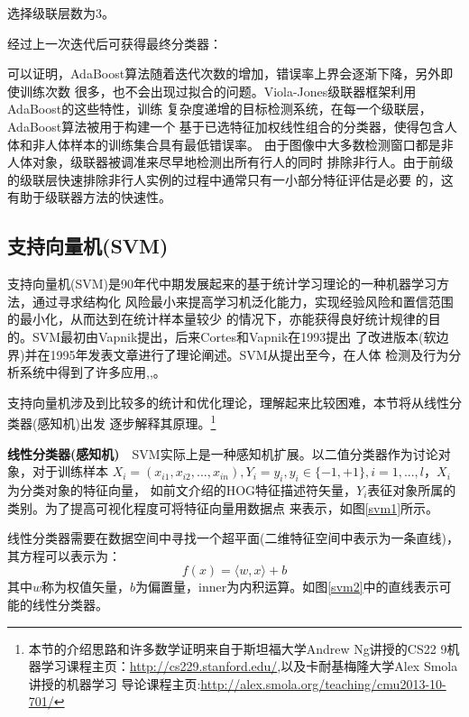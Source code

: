 选择级联层数为3。

经过上一次迭代后可获得最终分类器：

可以证明，AdaBoost算法随着迭代次数的增加，错误率上界会逐渐下降，另外即使训练次数
很多，也不会出现过拟合的问题。Viola-Jones级联器框架利用AdaBoost的这些特性，训练
复杂度递增的目标检测系统\cite{haar}，在每一个级联层，AdaBoost算法被用于构建一个
基于已选特征加权线性组合的分类器，使得包含人体和非人体样本的训练集合具有最低错误率。
由于图像中大多数检测窗口都是非人体对象，级联器被调准来尽早地检测出所有行人的同时
排除非行人。由于前级的级联层快速排除非行人实例的过程中通常只有一小部分特征评估是必要
的，这有助于级联器方法的快速性。

\subsection{支持向量机(SVM)}
支持向量机(SVM)是90年代中期发展起来的基于统计学习理论的一种机器学习方法，通过寻求结构化
风险最小来提高学习机泛化能力，实现经验风险和置信范围的最小化，从而达到在统计样本量较少
的情况下，亦能获得良好统计规律的目的。SVM最初由Vapnik提出，后来Cortes和Vapnik在1993提出
了改进版本(软边界)并在1995年发表文章\cite{svmorigin}进行了理论阐述。SVM从提出至今，在人体
检测及行为分析系统中得到了许多应用\cite{kth},\cite{DT2005},\cite{stip}。

支持向量机涉及到比较多的统计和优化理论，理解起来比较困难，本节将从线性分类器(感知机)出发
逐步解释其原理。\footnote{本节的介绍思路和许多数学证明来自于斯坦福大学Andrew Ng讲授的CS22
9机器学习课程主页：\url{http://cs229.stanford.edu/},以及卡耐基梅隆大学Alex Smola讲授的机器学习
导论课程主页:\url{http://alex.smola.org/teaching/cmu2013-10-701/}}

\textbf{线性分类器(感知机)}~~SVM实际上是一种感知机扩展。以二值分类器作为讨论对象，对于训练样本
$X_i=(x_{i1},x_{i2},...,x_{in}),Y_i=y_i,y_i\in\{-1,+1\},i=1,...,l$，$X_i$为分类对象的特征向量，
如前文介绍的HOG特征描述符矢量，$Y_i$表征对象所属的类别。为了提高可视化程度可将特征向量用数据点
来表示，如图\ref{svm1}所示。


线性分类器需要在数据空间中寻找一个超平面(二维特征空间中表示为一条直线)，其方程可以表示为：
\begin{equation}
    f(x)=\langle{}w,x\rangle+b
\end{equation}
其中$w$称为权值矢量，$b$为偏置量，\gls{inner}为内积运算。如图\ref{svm2}中的直线表示可能的线性分类器。


